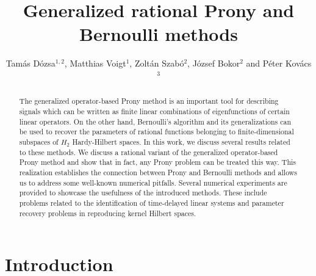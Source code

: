 \documentclass{arxiv}
\begin{document}

\title{Generalized rational Prony and Bernoulli methods}

\author{Tam\'as D\'ozsa$^{1,2}$, Matthias Voigt$^1$, Zolt\'an Szab\'o$^{2}$, J\'ozsef Bokor$^{2}$ and P\'eter Kov\'acs$^{3}$}






\begin{abstract}
The generalized operator-based Prony method is an important tool for describing signals which can be written as finite linear combinations of eigenfunctions of certain linear operators. On the other hand, Bernoulli's algorithm and its generalizations can be used to recover the parameters of rational functions belonging to finite-dimensional subspaces of $H_2$ Hardy-Hilbert spaces. In this work, we discuss several results related to these methods. We discuss a rational variant of the generalized operator-based Prony method and show that in fact, any Prony problem can be treated this way. This realization establishes the connection between Prony and Bernoulli methods and allows us to address some well-known numerical pitfalls. Several numerical experiments are provided to showcase the usefulness of the introduced methods. These include problems related to the identification of time-delayed linear systems and parameter recovery problems in reproducing kernel Hilbert spaces. 
\end{abstract}

\section{Introduction}
\label{sec:intro}
\end{document}
